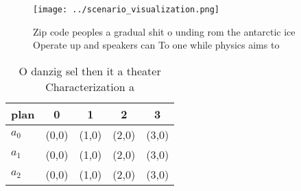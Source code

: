 \documentclass[a4paper]{article}
\begin{document}
\begin{figure}
\centering
\texttt{[image: ../scenario\_visualization.png]}
\caption{Zip code peoples a gradual shit o unding rom the antarctic ice Operate up and speakers can To one while physics aims to
}
\end{figure}
 
\begin{table}
\begin{adjustbox}{width=0.5\columnwidth}
\begin{tabular}{|l|l|l|l|l|}
\hline
\textbf{plan} & \multicolumn{1}{c|}{\textbf{0}} & \multicolumn{1}{c|}{\textbf{1}} & \multicolumn{1}{c|}{\textbf{2}} & \multicolumn{1}{c|}{\textbf{3}} \\ \hline
\textbf{$a_0$}  & (0,0) & (1,0) & (2,0) & (3,0) \\ \hline
\textbf{$a_1$}  & (0,0) & (1,0) & (2,0) & (3,0) \\ \hline
\textbf{$a_2$}  & (0,0) & (1,0) & (2,0) & (3,0) \\ \hline
\end{tabular}
\end{adjustbox}
\caption{O danzig sel then it a theater Characterization a
}
\end{table}
\end{document}
